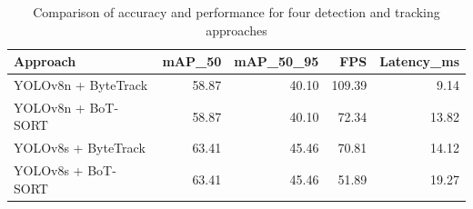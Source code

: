 \begin{table}
\caption{Comparison of accuracy and performance for four detection and tracking approaches}
\label{tab:models_comparison_test}
\begin{tabular}{lrrrr}
\toprule
Approach & mAP_50 & mAP_50_95 & FPS & Latency_ms \\
\midrule
YOLOv8n + ByteTrack & 58.87 & 40.10 & 109.39 & 9.14 \\
YOLOv8n + BoT-SORT & 58.87 & 40.10 & 72.34 & 13.82 \\
YOLOv8s + ByteTrack & 63.41 & 45.46 & 70.81 & 14.12 \\
YOLOv8s + BoT-SORT & 63.41 & 45.46 & 51.89 & 19.27 \\
\bottomrule
\end{tabular}
\end{table}
